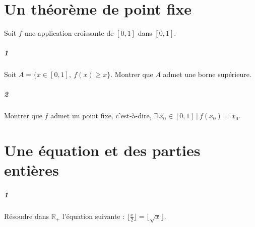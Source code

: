 \documentclass[10pt,a4paper]{article}
\begin{document}
\section{Un théorème de point fixe}
Soit $f$ une application croissante de $[0,1]$ dans $[0,1]$.
\subparagraph{1}Soit $A=\{ x \in [0,1], \ f(x) \geq x \}$. Montrer que $A$ admet une borne supérieure.
\subparagraph{2}Montrer que $f$ admet un point fixe, c'est-à-dire, $\exists \ x_0 \in [0,1] \ | \ f(x_0)=x_0$.

\section{Une équation et des parties entières}
\subparagraph{1}Résoudre dans $\mathbb{R}_{+}$ l'équation suivante : $\lfloor{\frac{x}{2}}\rfloor=\lfloor{\sqrt{x}}\rfloor$.
\end{document}
